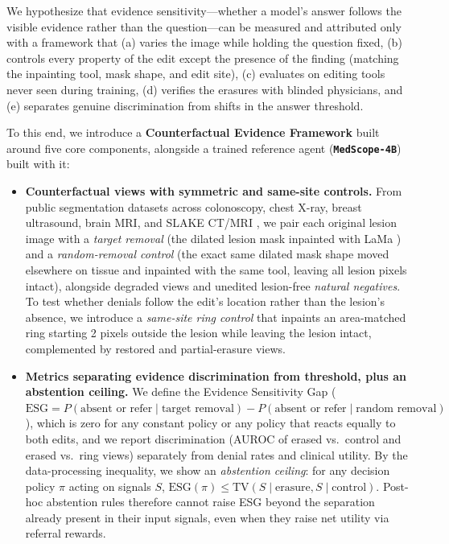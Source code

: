 \documentclass[5p,times,twocolumn,authoryear]{elsarticle}
\begin{document}
We hypothesize that evidence sensitivity---whether a model's answer follows the visible evidence rather than the question---can be measured and attributed only with a framework that (a) varies the image while holding the question fixed, (b) controls every property of the edit except the presence of the finding (matching the inpainting tool, mask shape, and edit site), (c) evaluates on editing tools never seen during training, (d) verifies the erasures with blinded physicians, and (e) separates genuine discrimination from shifts in the answer threshold.

To this end, we introduce a \textbf{Counterfactual Evidence Framework} built around five core components, alongside a trained reference agent (\textbf{\texttt{MedScope-4B}}) built with it:
\begin{itemize}[leftmargin=*,nosep]
    \item \textbf{Counterfactual views with symmetric and same-site controls.} From public segmentation datasets across colonoscopy, chest X-ray, breast ultrasound, brain MRI, and SLAKE CT/MRI \citep{liu2021slake,jha2020kvasir,borgli2020hyperkvasir,liu2020chestxdet,al2020dataset,buda2019association}, we pair each original lesion image with a \emph{target removal} (the dilated lesion mask inpainted with LaMa \citep{suvorov2022lama}) and a \emph{random-removal control} (the exact same dilated mask shape moved elsewhere on tissue and inpainted with the same tool, leaving all lesion pixels intact), alongside degraded views and unedited lesion-free \emph{natural negatives}. To test whether denials follow the edit's location rather than the lesion's absence, we introduce a \emph{same-site ring control} that inpaints an area-matched ring starting 2 pixels outside the lesion while leaving the lesion intact, complemented by restored and partial-erasure views.
    \item \textbf{Metrics separating evidence discrimination from threshold, plus an abstention ceiling.} We define the Evidence Sensitivity Gap ($\text{ESG} = P(\text{absent or refer} \mid \text{target removal}) - P(\text{absent or refer} \mid \text{random removal})$), which is zero for any constant policy or any policy that reacts equally to both edits, and we report discrimination (AUROC of erased vs.\ control and erased vs.\ ring views) separately from denial rates and clinical utility. By the data-processing inequality, we show an \emph{abstention ceiling}: for any decision policy $\pi$ acting on signals $S$, $\text{ESG}(\pi) \le \text{TV}(S \mid \text{erasure}, S \mid \text{control})$. Post-hoc abstention rules therefore cannot raise ESG beyond the separation already present in their input signals, even when they raise net utility via referral rewards.

\end{itemize}
\end{document}
